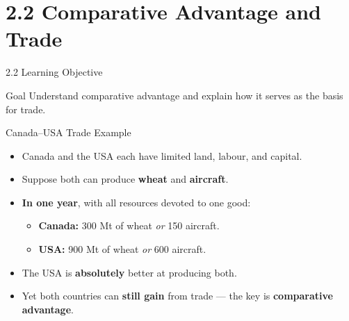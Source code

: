\documentclass[aspectratio=169]{beamer}
\begin{document}
\section{2.2 Comparative Advantage and Trade}

\begin{frame}{2.2 Learning Objective}
\transfade
\begin{block}{Goal}
Understand comparative advantage and explain how it serves as the basis for trade.
\end{block}
\end{frame}

\begin{frame}{Canada--USA Trade Example}
\transfade
\begin{itemize}
  \item Canada and the USA each have limited land, labour, and capital.
  \item Suppose both can produce \textbf{wheat} and \textbf{aircraft}.
  \item \textbf{In one year}, with all resources devoted to one good:
  \begin{itemize}
    \item \textbf{Canada:} 300 Mt of wheat \emph{or} 150 aircraft.
    \item \textbf{USA:} 900 Mt of wheat \emph{or} 600 aircraft.
  \end{itemize}
  \item The USA is \textbf{absolutely} better at producing both.
  \item Yet both countries can \textbf{still gain} from trade --- the key is \textbf{comparative advantage}.
\end{itemize}
\end{frame}
\end{document}
